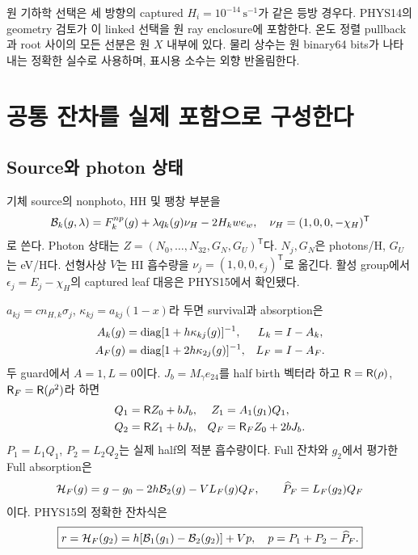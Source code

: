 원 기하학 선택은 세 방향의 captured $H_i=10^{-14}\,\mathrm{s}^{-1}$가 같은 등방 경우다. PHYS14의 geometry 검토가 이 linked 선택을 원 ray enclosure에 포함한다. 온도 정렬 pullback과 root 사이의 모든 선분은 원 $X$ 내부에 있다. 물리 상수는 원 binary64 bits가 나타내는 정확한 실수로 사용하며, 표시용 소수는 외향 반올림한다.\cite{phys14,phys15,sourceaudit}

\section{공통 잔차를 실제 포함으로 구성한다}\label{sec:residual}
\subsection{Source와 photon 상태}
기체 source의 nonphoto, HH 및 팽창 부분을
\begin{equation}
\mathcal B_k(g,\lambda)=F_k^{np}(g)+\lambda q_k(g)\nu_H-2H_kwe_w,
\quad \nu_H=(1,0,0,-\chi_H)^{\mathsf T}
\label{eq:source}
\end{equation}
로 쓴다. Photon 상태는 $Z=(N_0,\ldots,N_{32},G_N,G_U)^{\mathsf T}$다. $N_j,G_N$은 photons/H, $G_U$는 eV/H다. 선형사상 $V$는 HI 흡수량을 $\nu_j=(1,0,0,\epsilon_j)^{\mathsf T}$로 옮긴다. 활성 group에서 $\epsilon_j=E_j-\chi_H$의 captured leaf 대응은 PHYS15에서 확인됐다.

$a_{kj}=c n_{H,k}\sigma_j$, $\kappa_{kj}=a_{kj}(1-x)$라 두면 survival과 absorption은
\begin{align}
A_k(g)&=\operatorname{diag}[1+h\kappa_{kj}(g)]^{-1},&L_k&=I-A_k,\\
A_F(g)&=\operatorname{diag}[1+2h\kappa_{2j}(g)]^{-1},&L_F&=I-A_F.
\label{eq:survival}
\end{align}
두 guard에서 $A=1,L=0$이다. $J_b=M_\gamma e_{24}$를 half birth 벡터라 하고 $\mathsf R=\mathsf R(\rho)$, $\mathsf R_F=\mathsf R(\rho^2)$라 하면
\begin{align}
Q_1&=\mathsf R Z_0+bJ_b,& Z_1&=A_1(g_1)Q_1,\\
Q_2&=\mathsf R Z_1+bJ_b,& Q_F&=\mathsf R_F Z_0+2bJ_b.
\label{eq:incoming}
\end{align}
$P_1=L_1Q_1$, $P_2=L_2Q_2$는 실제 half의 적분 흡수량이다. Full 잔차와 $g_2$에서 평가한 Full absorption은
\begin{equation}
\mathcal H_F(g)=g-g_0-2h\mathcal B_2(g)-VL_F(g)Q_F,
\qquad \widehat P_F=L_F(g_2)Q_F
\label{eq:fullres}
\end{equation}
이다. PHYS15의 정확한 잔차식은
\begin{equation}
\boxed{r=\mathcal H_F(g_2)=h[\mathcal B_1(g_1)-\mathcal B_2(g_2)]+Vp,\quad
p=P_1+P_2-\widehat P_F.}
\label{eq:r}
\end{equation}

